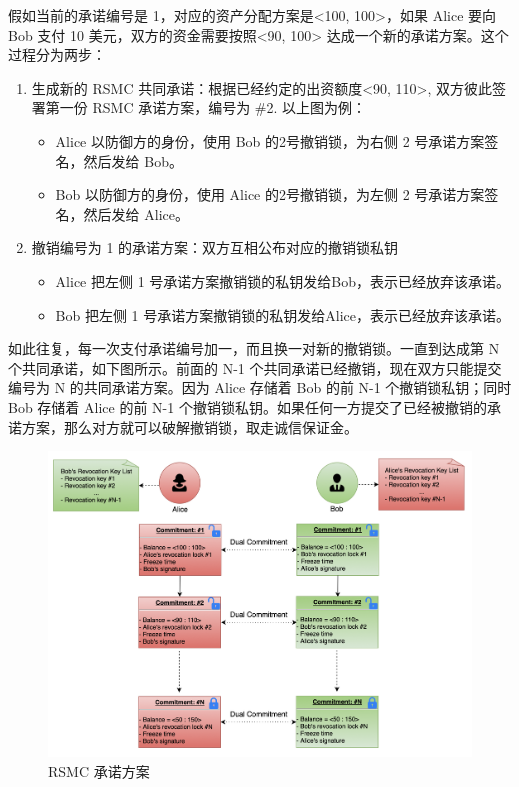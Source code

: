 假如当前的承诺编号是 1，对应的资产分配方案是<100, 100>，如果 Alice 要向 Bob 支付 10 美元，双方的资金需要按照<90, 100> 达成一个新的承诺方案。这个过程分为两步：
\begin{enumerate}

    \item 生成新的 RSMC 共同承诺：根据已经约定的出资额度<90, 110>, 双方彼此签署第一份 RSMC 承诺方案，编号为 \#2. 以上图为例：
        \begin{itemize}
            \item Alice 以防御方的身份，使用 Bob 的2号撤销锁，为右侧 2 号承诺方案签名，然后发给 Bob。
            \item Bob 以防御方的身份，使用 Alice 的2号撤销锁，为左侧 2 号承诺方案签名，然后发给 Alice。
        \end{itemize}

    \item 撤销编号为 1 的承诺方案：双方互相公布对应的撤销锁私钥
        \begin{itemize}
            \item Alice 把左侧 1 号承诺方案撤销锁的私钥发给Bob，表示已经放弃该承诺。
            \item Bob 把左侧 1 号承诺方案撤销锁的私钥发给Alice，表示已经放弃该承诺。
        \end{itemize}
\end{enumerate}

如此往复，每一次支付承诺编号加一，而且换一对新的撤销锁。一直到达成第 N 个共同承诺，如下图所示。前面的 N-1 个共同承诺已经撤销，现在双方只能提交编号为 N 的共同承诺方案。因为 Alice 存储着 Bob 的前 N-1 个撤销锁私钥；同时 Bob 存储着 Alice 的前 N-1 个撤销锁私钥。如果任何一方提交了已经被撤销的承诺方案，那么对方就可以破解撤销锁，取走诚信保证金。

\begin{figure}[h!]
    \centering
    \includegraphics[width=12cm, keepaspectratio]{../images/dual_rsmc_3.png}
    \caption{RSMC 承诺方案}
    \label{fig:rsmc_3}
\end{figure}

